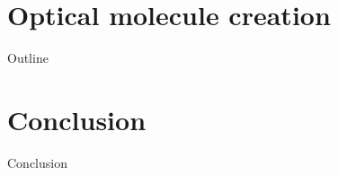 \documentclass{beamer}
\begin{document}

\begin{frame}{}
\end{frame}

\section{Optical molecule creation}
\begin{frame}{Outline}
  \tableofcontents[currentsection]
\end{frame}

\begin{frame}{}
\end{frame}

\begin{frame}{}
\end{frame}

\begin{frame}{}
\end{frame}

\section{Conclusion}
\begin{frame}{Conclusion}
\end{frame}

\begin{frame}{}
\end{frame}

\begin{frame}{}
\end{frame}

\end{document}
